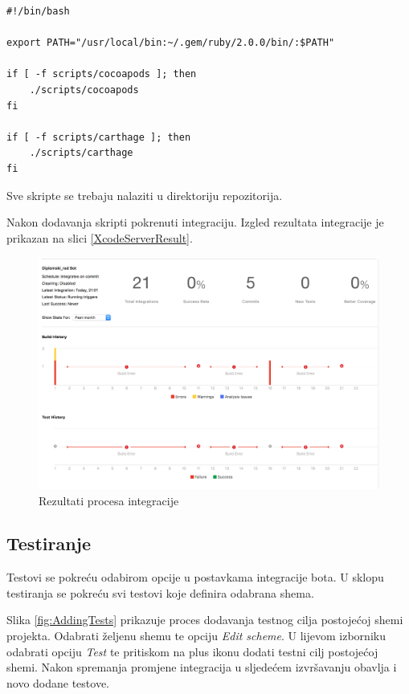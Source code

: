 \documentclass[times, utf8, diplomski, numeric]{fer}
\begin{document}
\begin{appendices}
\begin{lstlisting}[caption=Skripta koja se izvršava prije integracije, label=listing:pre_integration_script]
#!/bin/bash

export PATH="/usr/local/bin:~/.gem/ruby/2.0.0/bin/:$PATH"

if [ -f scripts/cocoapods ]; then
    ./scripts/cocoapods
fi

if [ -f scripts/carthage ]; then
    ./scripts/carthage
fi
\end{lstlisting}

Sve skripte se trebaju nalaziti u  direktoriju repozitorija.

Nakon dodavanja skripti pokrenuti integraciju. Izgled rezultata integracije je prikazan na slici \ref{XcodeServerResult}.

\begin{figure}
\centering
\includegraphics[scale=0.4]{XcodeServerResult}
\caption{Rezultati procesa integracije}
\label{fig:XcodeServerResult}
\end{figure}

\subsection{Testiranje}

Testovi se pokreću odabirom opcije  u postavkama integracije bota. U sklopu testiranja se pokreću svi testovi koje definira odabrana shema.

Slika \ref{fig:AddingTests} prikazuje proces dodavanja testnog cilja postojećoj shemi projekta. Odabrati željenu shemu te opciju \textit{Edit scheme}. U lijevom izborniku odabrati opciju \textit{Test} te pritiskom na plus ikonu dodati testni cilj postojećoj shemi. Nakon spremanja promjene integracija u sljedećem izvršavanju obavlja i novo dodane testove.


\end{appendices}
\end{document}
